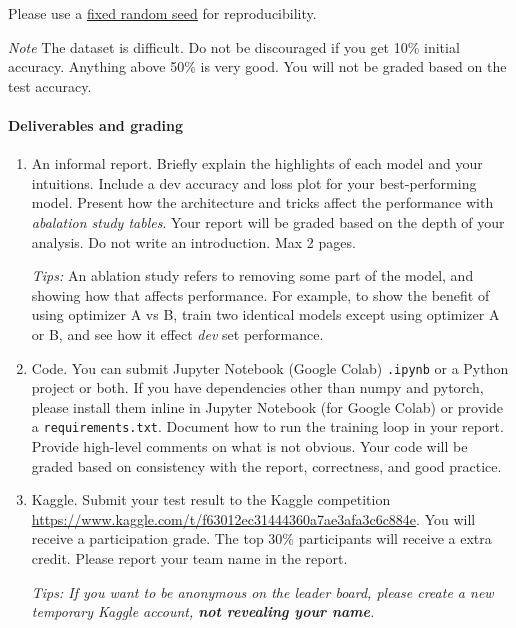 \documentclass[a4paper]{article}
\begin{document}
Please use a \href{https://pytorch.org/docs/stable/notes/randomness.html}{fixed random seed} for reproducibility.

\textit{Note} The dataset is difficult. Do not be discouraged if you get 10\% initial accuracy. Anything above 50\% is very good. You will not be graded based on the test accuracy. 

\paragraph{Deliverables and grading} 
\begin{enumerate}
\item An informal report. Briefly explain the highlights of each model and your intuitions. Include a dev accuracy and loss plot for your best-performing model. Present how the architecture and tricks affect the performance with \textit{abalation study tables}. Your report will be graded based on the depth of your analysis. Do not write an introduction. Max 2 pages.

\textit{Tips:} An ablation study refers to removing some part of the model, and showing how that affects performance. For example, to show the benefit of using optimizer A vs B, train two identical models except using optimizer A or B, and see how it effect \textit{dev} set performance.

\item Code. You can submit Jupyter Notebook (Google Colab) \texttt{.ipynb} or a Python project or both. If you have dependencies other than numpy and pytorch, please install them inline in Jupyter Notebook (for Google Colab) or provide a \texttt{requirements.txt}. Document how to run the training loop in your report. Provide high-level comments on what is not obvious. Your code will be graded based on consistency with the report, correctness, and good practice.
\item Kaggle. Submit your test result to the Kaggle competition \url{https://www.kaggle.com/t/f63012ec31444360a7ae3afa3c6c884e}. You will receive a participation grade. The top 30\% participants will receive a extra credit. Please report your team name in the report.

\textit{Tips: If you want to be anonymous on the leader board, please create a new temporary Kaggle account, \textbf{not revealing your name}.}
\end{enumerate}
\end{document}

